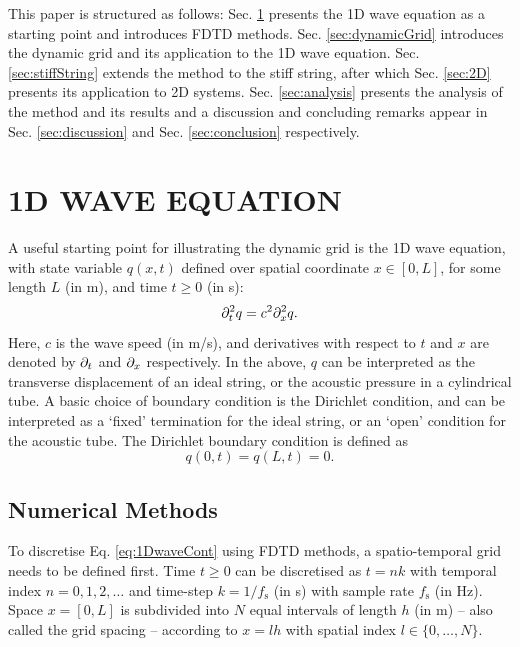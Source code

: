 \documentclass[fleqn]{jaes}
\begin{document}
This paper is structured as follows: Sec. \ref{sec:continuous} presents the 1D wave equation as a starting point and introduces FDTD methods. Sec. \ref{sec:dynamicGrid} introduces the dynamic grid and its application to the 1D wave equation. Sec. \ref{sec:stiffString} extends the method to the stiff string, after which Sec. \ref{sec:2D} presents its application to 2D systems. Sec. \ref{sec:analysis} presents the analysis of the method and its results and a discussion and concluding remarks appear in Sec. \ref{sec:discussion} and Sec. \ref{sec:conclusion} respectively.

\section{1D WAVE EQUATION}\label{sec:continuous}
A useful starting point for illustrating the dynamic grid is the 1D wave equation, with state variable $q(x, t)$ defined over spatial coordinate $x \in [0, L]$, for some length $L$ (in m), and time $t \geq 0$ (in s):
\begin{equation}\label{eq:1DwaveCont}
    \ptt q = c^2 \pxx q.
\end{equation}
Here, $c$ is the wave speed (in m/s), and derivatives with respect to $t$ and $x$ are denoted by $\partial_t$ and $\partial_x$ respectively. In the above, $q$ can be interpreted as the transverse displacement of an ideal string, or the acoustic pressure in a cylindrical tube. A basic choice of boundary condition is the Dirichlet condition, and can be interpreted as a `fixed' termination for the ideal string, or an `open' condition for the acoustic tube. The Dirichlet boundary condition is defined as
\begin{equation}%
    q(0, t) = q(L, t) = 0.\label{eq:contDirichlet}
\end{equation}
\subsection{Numerical Methods}\label{sec:numericalMethods}
To discretise Eq. \eqref{eq:1DwaveCont} using FDTD methods, a spatio-temporal grid needs to be defined first. 
Time $t\geq 0$ can be discretised as $t = nk$ with temporal index $n = 0, 1, 2, \hdots$ and time-step $k = 1/f_\text{s}$ (in s) with sample rate $f_\text{s}$ (in Hz). Space $x = [0, L]$ is subdivided into $N$ equal intervals of length $h$ (in m) -- also called the grid spacing -- according to $x = lh$ with spatial index $l\in \{0, \hdots, N\}$. 
\end{document}
